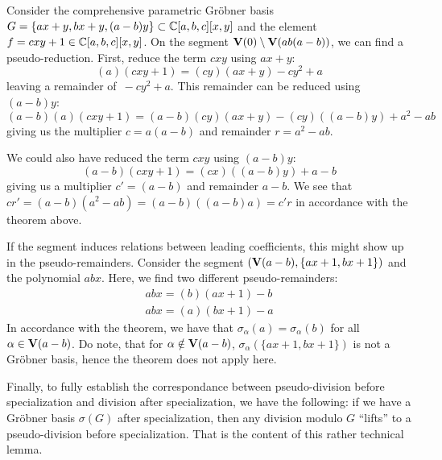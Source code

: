 \begin{example}\upshape
  Consider the comprehensive parametric Gröbner basis $G = \{ ax + y, bx + y, (a - b)y \} \subset \mathbb{C}[a, b, c][x, y]$ and the element $f = cxy + 1 \in \mathbb{C}[a, b, c][x, y]$. On the segment $\operatorname{\mathbf V}(0) \setminus \operatorname{\mathbf V}(ab(a-b))$, we can find a pseudo-reduction. First, reduce the term $cxy$ using $ax + y$:
  \[ (a)(cxy + 1) = (cy)(ax + y) - cy^{2} + a \]
  leaving a remainder of $\,-cy^{2} + a$. This remainder can be reduced using $(a - b)y$:
  \[(a-b)(a)(cxy + 1) = (a-b)(cy)(ax + y) - (cy)((a - b)y) + a^{2} - ab \]
  giving us the multiplier $c = a(a - b)$ and remainder $r = a^{2} - ab$.

  We could also have reduced the term $cxy$ using $(a - b)y$:
  \[(a-b)(cxy + 1) = (cx)((a-b)y) + a - b \]
  giving us a multiplier $c' = (a - b)$ and remainder $a - b$. We see that $c r' = (a-b)(a^{2} - ab) = (a - b)((a-b)a) = c' r$ in accordance with the theorem above.

  If the segment induces relations between leading coefficients, this might show up in the pseudo-remainders. Consider the segment $(\operatorname{\mathbf V}(a - b), \{ax + 1, bx + 1\})$ and the polynomial $abx$. Here, we find two different pseudo-remainders:
  \begin{align*}
    abx = (b)(ax + 1) - b \\
    abx = (a)(bx + 1) - a
  \end{align*}
  In accordance with the theorem, we have that $\sigma_{\alpha}(a) = \sigma_{\alpha}(b)$ for all $\alpha \in \operatorname{\mathbf V}(a - b)$. Do note, that for $\alpha \notin \operatorname{\mathbf V}(a - b)$, $\sigma_{\alpha}(\{ax + 1, bx + 1\})$ is not a Gröbner basis, hence the theorem does not apply here.
\end{example}

Finally, to fully establish the correspondance between pseudo-division before specialization and division after specialization, we have the following: if we have a Gröbner basis $\sigma(G)$ after specialization, then any division modulo $G$ ``lifts'' to a pseudo-division before specialization. That is the content of this rather technical lemma.


